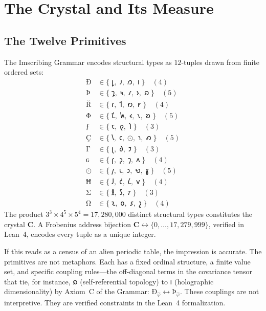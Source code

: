 \documentclass[12pt,twoside]{book}
\theoremstyle{definition}
\newcommand{\crystal}{\mathbf{C}}
\begin{document}
\tableofcontents

\chapter{The Crystal and Its Measure}

\section{The Twelve Primitives}

The Imscribing Grammar encodes structural types as $12$-tuples drawn from finite ordered sets:
\begin{align}
\text{Ð} &\in \{\;𐑛,\;𐑨,\;𐑼,\;𐑦\;\} \quad (4) \nonumber\\
\text{Þ} &\in \{\;𐑡,\;𐑰,\;𐑥,\;𐑶,\;𐑸\;\} \quad (5) \nonumber\\
\text{Ř} &\in \{\;𐑩,\;𐑑,\;𐑽,\;𐑾\;\} \quad (4) \nonumber\\
\text{Φ} &\in \{\;𐑗,\;𐑿,\;𐑬,\;𐑯,\;𐑹\;\} \quad (5) \nonumber\\
\text{ƒ} &\in \{\;𐑱,\;𐑞,\;𐑐\;\} \quad (3) \nonumber\\
\text{Ç} &\in \{\;𐑘,\;𐑤,\;\text{⊙},\;𐑪,\;𐑺\;\} \quad (5) \nonumber\\
\text{Γ} &\in \{\;𐑚,\;𐑔,\;𐑲\;\} \quad (3) \nonumber\\
\text{ɢ} &\in \{\;𐑝,\;𐑜,\;𐑠,\;𐑵\;\} \quad (4) \nonumber\\
\text{⊙} &\in \{\;𐑢,\;𐑧,\;𐑮,\;𐑻,\;𐑣\;\} \quad (5) \nonumber\\
\text{Ħ} &\in \{\;𐑓,\;𐑒,\;𐑖,\;𐑫\;\} \quad (4) \nonumber\\
\text{Σ} &\in \{\;𐑙,\;𐑕,\;𐑳\;\} \quad (3) \nonumber\\
\text{Ω} &\in \{\;𐑷,\;𐑴,\;𐑭,\;𐑟\;\} \quad (4) \nonumber
\end{align}
The product $3^3 \times 4^5 \times 5^4 = 17{,}280{,}000$ distinct structural types
constitutes the crystal $\crystal$. A Frobenius address bijection
$\crystal \leftrightarrow \{0,\ldots,17{,}279{,}999\}$, verified in Lean~4, encodes every
tuple as a unique integer.

If this reads as a census of an alien periodic table, the impression is accurate. The
primitives are not metaphors. Each has a fixed ordinal structure, a finite value set, and
specific coupling rules---the off-diagonal terms in the covariance tensor that tie, for
instance, 𐑸 (self-referential topology) to 𐑦 (holographic dimensionality) by Axiom~C of
the Grammar: $\text{Ð}_{\hat{\varphi}} \leftrightarrow \text{Þ}_{\hat{\varphi}}$. These
couplings are not interpretive. They are verified constraints in the Lean~4 formalization.
\end{document}
